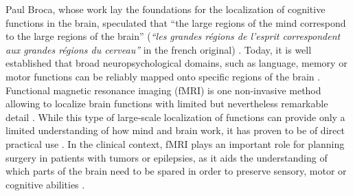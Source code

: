 \documentclass[fleqn,10pt]{SelfArx} %
\begin{document}
Paul Broca, whose work lay the foundations for the localization of cognitive functions in the brain, speculated that “the large regions of the mind correspond to the large regions of the brain” (\textit{“les grandes régions de l'esprit correspondent aux grandes régions du cerveau”} in the french original) \citep{Broca_1861}. Today, it is well established that broad neuropsychological domains, such as language, memory or motor functions can be reliably mapped onto specific regions of the brain \citep{Satterthwaite_2015}. Functional magnetic resonance imaging (fMRI) is one non-invasive method allowing to localize brain functions with limited but nevertheless remarkable detail \citep{Kanwisher_2017}. While this type of large-scale localization of functions can provide only a limited understanding of how mind and brain work, it has proven to be of direct practical use \citep{Bunzl_2010, Szaflarski_2017}. In the clinical context, fMRI plays an important role for planning surgery in patients with tumors or epilepsies, as it aids the understanding of which parts of the brain need to be spared in order to preserve sensory, motor or cognitive abilities \citep{Stippich_2015}.
\end{document}
